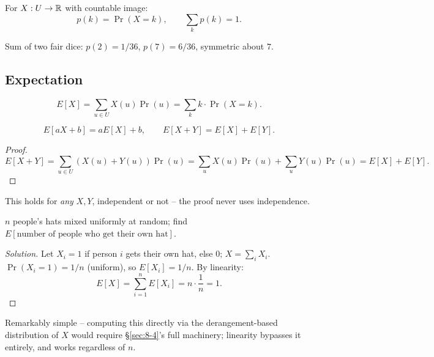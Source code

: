 \documentclass[11pt]{article}
\begin{document}
\begin{definition}
For $X:U\to\mathbb{R}$ with countable image:
\[
p(k) = \Pr(X=k), \qquad \sum_k p(k) = 1.
\]
\end{definition}

\begin{example}
Sum of two fair dice: $p(2)=1/36$, $p(7)=6/36$, symmetric about $7$.
\end{example}

\subsection{Expectation}
\label{sec:10-3}

\begin{definition}[Expectation]
\[
E[X] = \sum_{u\in U} X(u)\Pr(u) = \sum_k k\cdot\Pr(X=k).
\]
\end{definition}

\begin{theorem}
\[
E[aX+b] = aE[X]+b, \qquad E[X+Y] = E[X]+E[Y].
\]
\end{theorem}
\begin{proof}
\[
E[X+Y] = \sum_{u\in U}(X(u)+Y(u))\Pr(u) = \sum_u X(u)\Pr(u) + \sum_u Y(u)\Pr(u) = E[X]+E[Y].
\]
\end{proof}

\begin{note}
This holds for \emph{any} $X,Y$, independent or not -- the proof never uses independence.
\end{note}

\bigskip
\begin{example}
$n$ people's hats mixed uniformly at random; find $E[\text{number of people who get their own hat}]$.
\end{example}
\begin{proof}[Solution]
Let $X_i=1$ if person $i$ gets their own hat, else $0$; $X=\sum_i X_i$. $\Pr(X_i=1)=1/n$ (uniform), so $E[X_i]=1/n$. By linearity:
\[
E[X] = \sum_{i=1}^n E[X_i] = n\cdot\frac1n = 1.
\]
\end{proof}
\begin{note}
Remarkably simple -- computing this directly via the derangement-based distribution of $X$ would require \S\ref{sec:8-4}'s full machinery; linearity bypasses it entirely, and works regardless of $n$.
\end{note}
\end{document}
